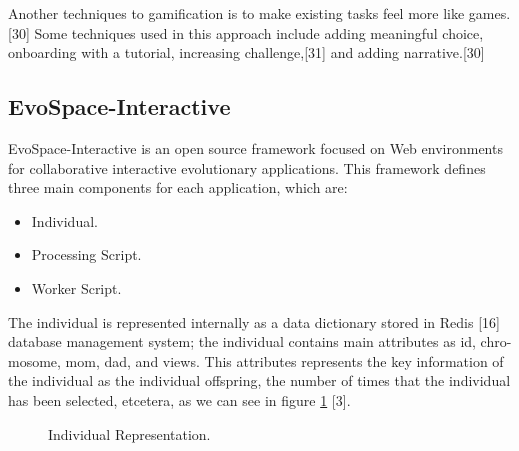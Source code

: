 Another techniques to gamification is to make existing tasks feel more like
games.[30] Some techniques used in this approach include adding meaningful
choice, onboarding with a tutorial, increasing challenge,[31] and adding
narrative.[30]

\subsection{EvoSpace-Interactive} EvoSpace-Interactive is an open source
framework focused on Web environments for collaborative interactive evolutionary
applications. This framework defines three main components for each application,
which are: 
\begin{itemize} 
\item Individual.  
\item Processing Script. 
\item Worker Script. 
\end{itemize}

The individual is represented internally as a data dictionary stored in Redis
[16] database management system; the individual contains main attributes as id,
chro-mosome, mom, dad, and views. This attributes represents the key information
of the individual as the individual offspring, the number of times that the
individual has been selected, etcetera, as we can see in figure \ref{fig:individualRep} [3].

\begin{figure}
\captionsetup{justification=centering,margin=2cm}
\centering
\setlength\fboxsep{0pt}
\setlength\fboxrule{0.7pt}
\caption{Individual Representation.}
\label{fig:individualRep}       
\end{figure}

